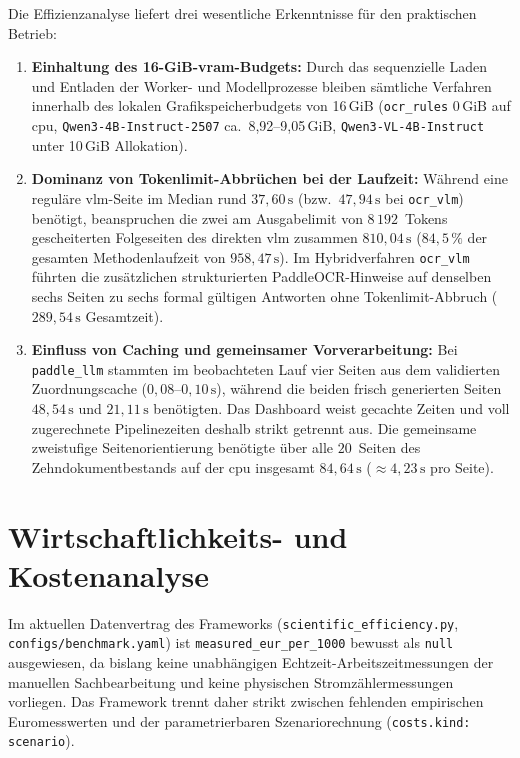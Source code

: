 Die Effizienzanalyse liefert drei wesentliche Erkenntnisse für den praktischen Betrieb:
\begin{enumerate}
  \item \textbf{Einhaltung des \mbox{16-GiB}-\ac{vram}-Budgets:} Durch das sequenzielle Laden und Entladen der Worker- und Modellprozesse bleiben sämtliche Verfahren innerhalb des lokalen Grafikspeicherbudgets von \mbox{16\,GiB} (\texttt{ocr\_rules} $0\,\text{GiB}$ auf \ac{cpu}, \texttt{Qwen3-4B-Instruct-2507} ca.\ \mbox{8,92--9,05\,GiB}, \texttt{Qwen3-VL-4B-Instruct} unter \mbox{10\,GiB} Allokation).
  \item \textbf{Dominanz von Tokenlimit-Abbrüchen bei der Laufzeit:} Während eine reguläre \ac{vlm}-Seite im Median rund $37{,}60\,\mathrm{s}$ (bzw.\ $47{,}94\,\mathrm{s}$ bei \texttt{ocr\_vlm}) benötigt, beanspruchen die zwei am Ausgabelimit von $8\,192$~Tokens gescheiterten Folgeseiten des direkten \ac{vlm} zusammen $810{,}04\,\mathrm{s}$ ($84{,}5\,\%$ der gesamten Methodenlaufzeit von $958{,}47\,\mathrm{s}$). Im Hybridverfahren \texttt{ocr\_vlm} führten die zusätzlichen strukturierten PaddleOCR-Hinweise auf denselben sechs Seiten zu sechs formal gültigen Antworten ohne Tokenlimit-Abbruch ($289{,}54\,\mathrm{s}$ Gesamtzeit).
  \item \textbf{Einfluss von Caching und gemeinsamer Vorverarbeitung:} Bei \texttt{paddle\_llm} stammten im beobachteten Lauf vier Seiten aus dem validierten Zuordnungscache ($0{,}08$--$0{,}10\,\mathrm{s}$), während die beiden frisch generierten Seiten $48{,}54\,\mathrm{s}$ und $21{,}11\,\mathrm{s}$ benötigten. Das Dashboard weist gecachte Zeiten und voll zugerechnete Pipelinezeiten deshalb strikt getrennt aus. Die gemeinsame zweistufige Seitenorientierung benötigte über alle $20$~Seiten des Zehndokumentbestands auf der \ac{cpu} insgesamt $84{,}64\,\mathrm{s}$ ($\approx 4{,}23\,\mathrm{s}$ pro Seite).
\end{enumerate}

\section{Wirtschaftlichkeits- und Kostenanalyse}
\label{sec:ergebnisse-kosten}

Im aktuellen Datenvertrag des Frameworks (\texttt{scientific\_efficiency.py}, \texttt{configs/benchmark.yaml}) ist \texttt{measured\_eur\_per\_1000} bewusst als \texttt{null} ausgewiesen, da bislang keine unabhängigen Echtzeit-Arbeitszeitmessungen der manuellen Sachbearbeitung und keine physischen Stromzählermessungen vorliegen. Das Framework trennt daher strikt zwischen fehlenden empirischen Euromesswerten und der parametrierbaren Szenariorechnung (\texttt{costs.kind: scenario}).


